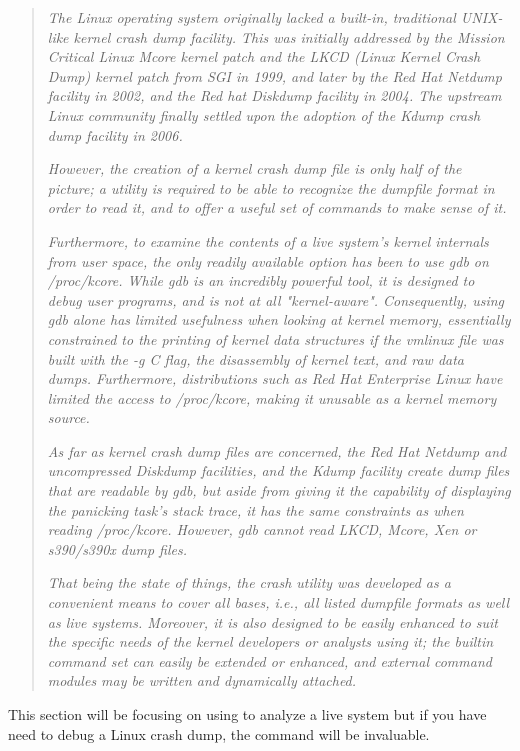 \begin{quote}
\textit{The Linux operating system originally lacked a built-in, traditional UNIX-like kernel crash dump facility. This was initially addressed by the Mission Critical Linux Mcore kernel patch and the LKCD (Linux Kernel Crash Dump) kernel patch from SGI in 1999, and later by the Red Hat Netdump facility in 2002, and the Red hat Diskdump facility in 2004. The upstream Linux community finally settled upon the adoption of the Kdump crash dump facility in 2006.}

\textit{However, the creation of a kernel crash dump file is only half of the picture; a utility is required to be able to recognize the dumpfile format in order to read it, and to offer a useful set of commands to make sense of it.}

\textit{Furthermore, to examine the contents of a live system's kernel internals from user space, the only readily available option has been to use gdb on /proc/kcore. While gdb is an incredibly powerful tool, it is designed to debug user programs, and is not at all "kernel-aware". Consequently, using gdb alone has limited usefulness when looking at kernel memory, essentially constrained to the printing of kernel data structures if the vmlinux file was built with the -g C flag, the disassembly of kernel text, and raw data dumps. Furthermore, distributions such as Red Hat Enterprise Linux have limited the access to /proc/kcore, making it unusable as a kernel memory source.}

\textit{As far as kernel crash dump files are concerned, the Red Hat Netdump and uncompressed Diskdump facilities, and the Kdump facility create dump files that are readable by gdb, but aside from giving it the capability of displaying the panicking task's stack trace, it has the same constraints as when reading /proc/kcore. However, gdb cannot read LKCD, Mcore, Xen or s390/s390x dump files.}

\textit{That being the state of things, the crash utility was developed as a convenient means to cover all bases, i.e., all listed dumpfile formats as well as live systems. Moreover, it is also designed to be easily enhanced to suit the specific needs of the kernel developers or analysts using it; the builtin command set can easily be extended or enhanced, and external command modules may be written and dynamically attached.}
\end{quote}

\noindent
This section will be focusing on using  to analyze a live system but if you have need to debug a Linux crash dump, the  command will be invaluable.

